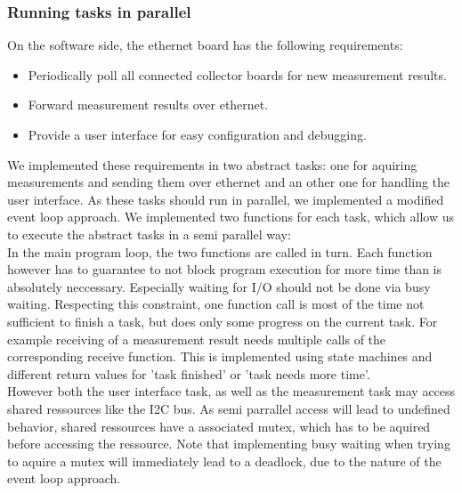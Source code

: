 \documentclass[a4paper]{scrreprt}
\begin{document}
\subsubsection{Running tasks in parallel}
On the software side, the ethernet board has the following requirements:
\begin{itemize}
  \item Periodically poll all connected collector boards for new measurement results.
  \item Forward measurement results over ethernet.
  \item Provide a user interface for easy configuration and debugging.
\end{itemize}
We implemented these requirements in two abstract tasks: one for aquiring measurements and sending them
over ethernet and an other one for handling the user interface.
As these tasks should run in parallel, we implemented a modified event loop approach. We
implemented two functions for each task, which allow us to execute the abstract tasks
in a semi parallel way:\\
In the main program loop, the two functions are called in turn. Each function however has to guarantee to
not block program execution for more time than is absolutely neccessary. Especially waiting for I/O
should not be done via busy waiting. Respecting this constraint, one function
call is most of the time not sufficient to finish a task, but does only some progress on the
current task. For example receiving of a measurement result needs multiple calls
of the corresponding receive function. This is implemented using state machines and different
return values for 'task finished' or 'task needs more time'.\\
However both the user interface task, as well as the measurement task may access shared ressources
like the I2C bus. As semi parrallel access will lead to undefined behavior, shared ressources
have a associated mutex, which has to be aquired before accessing the ressource. Note that implementing
busy waiting when trying to aquire a mutex will immediately lead to a deadlock, due to the nature
of the event loop approach.
\end{document}
